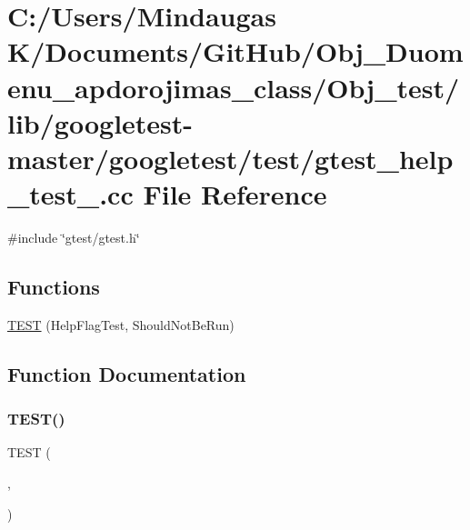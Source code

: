 \hypertarget{_obj__test_2lib_2googletest-master_2googletest_2test_2gtest__help__test___8cc}{}\section{C\+:/\+Users/\+Mindaugas K/\+Documents/\+Git\+Hub/\+Obj\+\_\+\+Duomenu\+\_\+apdorojimas\+\_\+class/\+Obj\+\_\+test/lib/googletest-\/master/googletest/test/gtest\+\_\+help\+\_\+test\+\_\+.cc File Reference}
\label{_obj__test_2lib_2googletest-master_2googletest_2test_2gtest__help__test___8cc}
{\ttfamily \#include \char`\"{}gtest/gtest.\+h\char`\"{}}\newline
\subsection*{Functions}
\begin{DoxyCompactItemize}
\item 
\mbox{\hyperlink{_obj__test_2lib_2googletest-master_2googletest_2test_2gtest__help__test___8cc_add505cb10a4fda179911b3f349ff9696}{T\+E\+ST}} (Help\+Flag\+Test, Should\+Not\+Be\+Run)
\end{DoxyCompactItemize}


\subsection{Function Documentation}
\mbox{\label{_obj__test_2lib_2googletest-master_2googletest_2test_2gtest__help__test___8cc_add505cb10a4fda179911b3f349ff9696}} 
\subsubsection{\texorpdfstring{TEST()}{TEST()}}
{\footnotesize\ttfamily T\+E\+ST (\begin{DoxyParamCaption}\item[{Help\+Flag\+Test}]{,  }\item[{Should\+Not\+Be\+Run}]{ }\end{DoxyParamCaption})}

